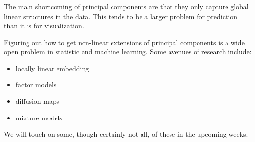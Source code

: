 \documentclass[xetex,mathserif,serif,aspectratio=169]{beamer}
\begin{document}
\begin{frame}[fragile] \frametitle{}  \oldB \small


The main shortcoming of principal components are that they only
capture global linear structures in the data. This tends to be
a larger problem for prediction than it is for visualization.

Figuring out how to get non-linear extensions of principal
components is a wide open problem in statistic and machine learning.
Some avenues of research include:
\begin{itemize}
\item locally linear embedding
\item factor models
\item diffusion maps
\item mixture models
\end{itemize}
We will touch on some, though certainly not all, of these in the
upcoming weeks.

\end{frame}
\end{document}
